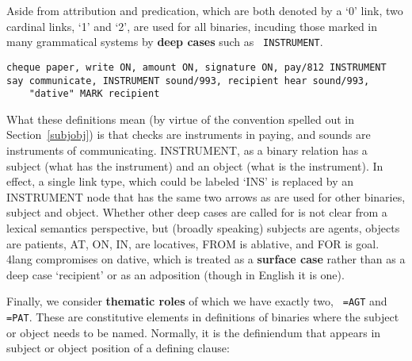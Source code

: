 \documentclass[11pt,bookmarks,bookmarksnumbered,naturalnames,plainpages=false,pdftex,colorlinks=true,urlcolor=blue,bookmarksdepth=subsection,plainpages=false]{paper}
\begin{document}
Aside from attribution and predication, which are both denoted by a `0' link,
two cardinal links, `1' and `2', are used for all binaries, incuding those
marked in many grammatical systems by {\bf deep cases} such as {\tt
  INSTRUMENT}. 

\begin{verbatim}
cheque paper, write ON, amount ON, signature ON, pay/812 INSTRUMENT
say communicate, INSTRUMENT sound/993, recipient hear sound/993, 
    "dative" MARK recipient
\end{verbatim}

What these definitions mean (by virtue of the convention spelled out in
Section~\ref{subjobj}) is that checks are instruments in paying, and sounds
are instruments of communicating. INSTRUMENT, as a binary relation has a
subject (what has the instrument) and an object (what is the instrument). In
effect, a single link type, which could be labeled `INS' is replaced by an
INSTRUMENT node that has the same two arrows as are used for other binaries,
subject and object. Whether other deep cases are called for is not clear from
a lexical semantics perspective, but (broadly speaking) subjects are agents,
objects are patients, AT, ON, IN, are locatives, FROM is ablative, and FOR is
goal. 4lang compromises on dative, which is treated as a {\bf surface case}
rather than as a deep case `recipient' or as an adposition (though in English
it is one). 



\bigskip
Finally, we consider {\bf thematic roles} of which we have exactly two, {\tt
  =AGT} and {\tt =PAT}. These are constitutive elements in definitions of
binaries where the subject or object needs to be named. Normally, it is the
definiendum that appears in subject or object position of a defining clause:
\end{document}

